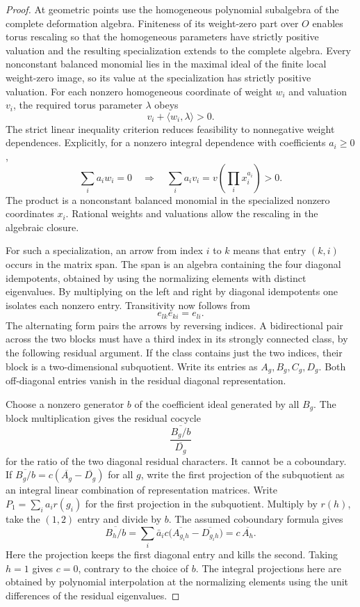 \begin{proof}
At geometric points use the homogeneous polynomial
subalgebra of the complete deformation algebra. Finiteness
of its weight-zero part over \(O\) enables torus rescaling
so that the homogeneous parameters have strictly positive
valuation and the resulting specialization extends to the
complete algebra. Every nonconstant balanced monomial lies
in the maximal ideal of the finite local weight-zero image, so
its value at the specialization has strictly positive valuation.
For each nonzero homogeneous coordinate of weight \(w_i\) and
valuation \(v_i\), the required torus parameter \(\lambda\) obeys
\[
                      v_i+\langle w_i,\lambda\rangle>0 .
\]
The strict linear inequality criterion reduces feasibility to
nonnegative weight dependences. Explicitly, for a nonzero integral dependence with coefficients \(a_i\ge0\),
\[
 \sum_i a_iw_i=0\quad\Longrightarrow\quad
 \sum_i a_i v_i=v\!\left(\prod_i x_i^{a_i}\right)>0 .
\]
The product is a nonconstant balanced monomial in the specialized nonzero coordinates \(x_i\). Rational weights and valuations allow the
rescaling in the algebraic closure.

For such a specialization, an arrow from index \(i\) to
\(k\) means that entry \((k,i)\) occurs in the matrix span.
The span is an algebra containing the four diagonal
idempotents, obtained by using the normalizing elements
with distinct eigenvalues. By multiplying on the left and right by diagonal idempotents one isolates each nonzero entry. Transitivity now follows from
\[
 e_{lk}e_{ki}=e_{li}.
\]
The alternating form pairs the arrows by reversing indices. A bidirectional pair across the two blocks must
have a third index in its strongly connected class, by
the following residual argument. If the class contains just
the two indices, their block is a two-dimensional subquotient.
Write its entries as \(A_g,B_g,C_g,D_g\). Both off-diagonal
entries vanish in the residual diagonal representation.

Choose
a nonzero generator \(b\) of the coefficient ideal generated
by all \(B_g\). The block multiplication gives the residual
cocycle
\[
                      \frac{\overline{B_g/b}}{\overline{D_g}}
\]
for the ratio of the two diagonal residual characters.
It cannot be a coboundary. If
\(\overline{B_g/b}=c(\overline{A_g}-\overline{D_g})\)
for all \(g\), write the first projection of the subquotient
as an integral linear combination of representation matrices.
Write \(P_1=\sum_i a_i r(g_i)\) for the first projection in
the subquotient. Multiply by \(r(h)\), take the \((1,2)\) entry
and divide by \(b\). The assumed coboundary formula gives
\[
   \overline{B_h/b}
     =\sum_i \bar a_i c\bigl(\overline{A_{g_ih}}
                                 -\overline{D_{g_ih}}\bigr)
     = c\,\overline{A_h}.
\]
Here the projection keeps the first diagonal entry and kills the
second. Taking \(h=1\) gives \(c=0\), contrary to the choice of \(b\).
The integral projections here are obtained by polynomial
interpolation at the normalizing elements using the unit
differences of the residual eigenvalues.


\end{proof}
